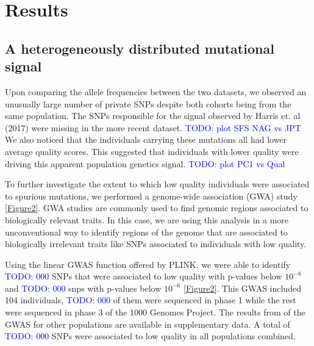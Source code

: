 \documentclass[12pt]{amsart}
\newcommand{\todo}[1]{\textcolor{blue}{TODO: #1}}
\begin{document}
			\section{Results}
	\subsection{A heterogeneously distributed mutational signal}			
Upon comparing the allele frequencies between the two datasets, we observed an unusually large number of private SNPs despite both cohorts being from the same population.
The SNPs responsible for the signal observed by Harris et. al (2017) were missing in the more recent dataset. 
\todo{plot SFS NAG vs JPT}
We also noticed that the individuals carrying these mutations all had lower average quality scores.
This suggested that individuals with lower quality were driving this apparent population genetics signal.
\todo{plot PC1 vs Qual}


To further investigate	 the extent to which low quality individuals were associated to spurious mutations, we performed a genome-wide association (GWA) study  \ref{Figure2}. GWA studies are commonly used to find genomic regions associated to biologically relevant traits. In this case, we are using this analysis in a more unconventional way to identify regions of the genome that are associated to biologically irrelevant traits like SNPs associated to individuals with low quality.
 
Using the linear GWAS function offered by PLINK, we were able to identify \todo{000} SNPs that were associated to low quality with  p-values below $10^{-8}$ and \todo{000} snps with p-values below $10^{-6}$ \ref{Figure2}.  This GWAS included 104 individuals, \todo{000} of them were sequenced in phase 1 while the rest were sequenced in phase 3 of the 1000 Genomes Project.
The results from of the GWAS for other populations are available in supplementary data. 
A total of \todo{000} SNPs were associated to low quality in all populations combined.
\end{document}
